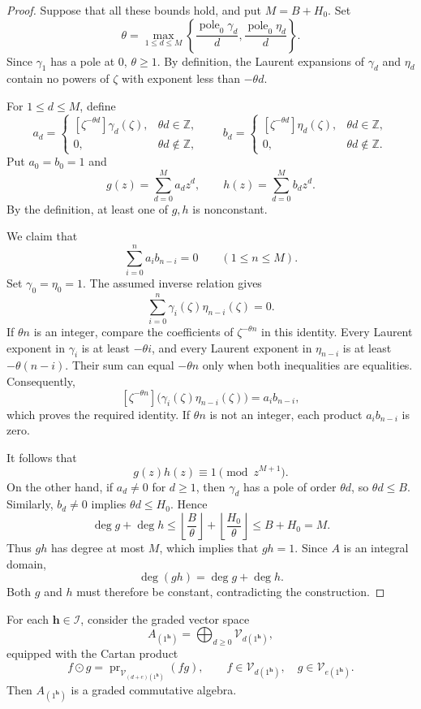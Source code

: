 \documentclass[11pt,reqno]{amsart}
\theoremstyle{corollary}
\theoremstyle{conjecture}
\theoremstyle{assumption}
\theoremstyle{proposition}
\theoremstyle{remark}
\numberwithin{equation}{section}
\begin{document}
\begin{proof}
Suppose that all these bounds hold, and put $M=B+H_0$. Set
\[
\theta=\max_{1\leq d\leq M}\left\{\frac{\operatorname{pole}_0\gamma_d}{d},\frac{\operatorname{pole}_0\eta_d}{d}\right\}.
\]
Since $\gamma_1$ has a pole at $0$, $\theta\geq1$. By definition, the Laurent expansions of $\gamma_d$ and $\eta_d$ contain no powers of $\zeta$ with exponent less than $-\theta d$.

For $1\leq d\leq M$, define
\[
a_d=
\begin{cases}
[\zeta^{-\theta d}]\gamma_d(\zeta),&\theta d\in\mathbb Z,\\
0,&\theta d\notin\mathbb Z,
\end{cases}
\qquad
b_d=
\begin{cases}
[\zeta^{-\theta d}]\eta_d(\zeta),&\theta d\in\mathbb Z,\\
0,&\theta d\notin\mathbb Z.
\end{cases}
\]
Put $a_0=b_0=1$ and
\[
g(z)=\sum_{d=0}^{M}a_dz^d,\qquad h(z)=\sum_{d=0}^{M}b_dz^d.
\]
By the definition, at least one of $g,h$ is nonconstant.

We claim that
\[
\sum_{i=0}^{n}a_i b_{n-i}=0\qquad (1\leq n\leq M).
\]
Set $\gamma_0=\eta_0=1$. The assumed inverse relation gives
\[
\sum_{i=0}^{n}\gamma_i(\zeta)\eta_{n-i}(\zeta)=0.
\]
If $\theta n$ is an integer, compare the coefficients of $\zeta^{-\theta n}$ in this identity. Every Laurent exponent in $\gamma_i$ is at least $-\theta i$, and every Laurent exponent in $\eta_{n-i}$ is at least $-\theta(n-i)$. Their sum can equal $-\theta n$ only when both inequalities
are equalities. Consequently,
\[
[\zeta^{-\theta n}]\bigl(\gamma_i(\zeta)\eta_{n-i}(\zeta)\bigr)=a_i b_{n-i},
\]
which proves the required identity. If $\theta n$ is not an integer, each product $a_i b_{n-i}$ is zero.

It follows that
\[
g(z)h(z)\equiv1\pmod{z^{M+1}}.
\]
On the other hand, if $a_d\neq 0$ for $d\geq1$, then $\gamma_d$ has a pole of order $\theta d$, so $\theta d\leq B$. Similarly, $b_d\ne0$ implies $\theta d\leq H_0$. Hence
\[
\deg g+\deg h\leq\left\lfloor\frac{B}{\theta}\right\rfloor+\left\lfloor\frac{H_0}{\theta}\right\rfloor\leq B+H_0=M.
\]
Thus $gh$ has degree at most $M$, which implies that $gh=1$. Since $A$ is an integral domain,
\[
\deg(gh)=\deg g+\deg h.
\]
Both $g$ and $h$ must therefore be constant, contradicting the construction.
\end{proof}

For each $\mathbf h\in\mathcal I$, consider the graded vector space
\[
A_{(1^{\mathbf h})}=\bigoplus_{d\geq0}\mathcal V_{d(1^{\mathbf h})},
\]
equipped with the Cartan product
\[
f\odot g=\operatorname{pr}_{\mathcal V_{(d+e)(1^{\mathbf h})}}(fg),\qquad f\in\mathcal V_{d(1^{\mathbf h})},\quad g\in\mathcal V_{e(1^{\mathbf h})}.
\]
Then $A_{(1^{\mathbf h})}$ is a graded commutative algebra.
\end{document}
